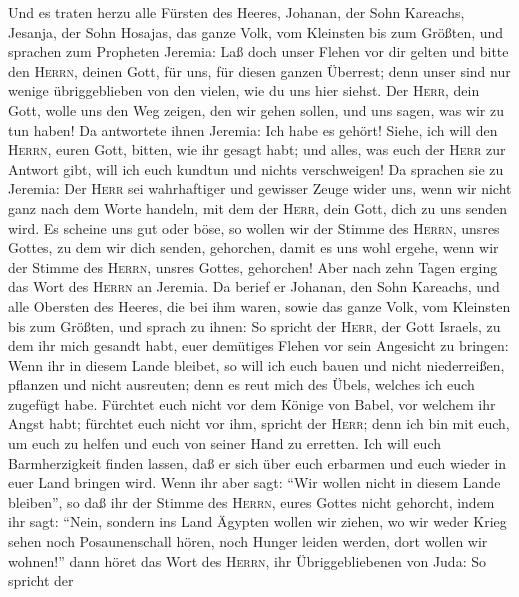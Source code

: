  Und es traten herzu alle Fürsten des Heeres, Johanan, der
Sohn Kareachs, Jesanja, der Sohn Hosajas, das ganze Volk, vom Kleinsten
bis zum Größten,  und sprachen zum Propheten Jeremia: Laß
doch unser Flehen vor dir gelten und bitte den \textsc{Herrn}, deinen
Gott, für uns, für diesen ganzen Überrest; denn unser sind nur wenige
übriggeblieben von den vielen, wie du uns hier siehst. 
Der \textsc{Herr}, dein Gott, wolle uns den Weg zeigen, den wir gehen
sollen, und uns sagen, was wir zu tun haben!  Da
antwortete ihnen Jeremia: Ich habe es gehört! Siehe, ich will den
\textsc{Herrn}, euren Gott, bitten, wie ihr gesagt habt; und alles, was
euch der \textsc{Herr} zur Antwort gibt, will ich euch kundtun und
nichts verschweigen!  Da sprachen sie zu Jeremia: Der
\textsc{Herr} sei wahrhaftiger und gewisser Zeuge wider uns, wenn wir
nicht ganz nach dem Worte handeln, mit dem der \textsc{Herr}, dein Gott,
dich zu uns senden wird.  Es scheine uns gut oder böse, so
wollen wir der Stimme des \textsc{Herrn}, unsres Gottes, zu dem wir dich
senden, gehorchen, damit es uns wohl ergehe, wenn wir der Stimme des
\textsc{Herrn}, unsres Gottes, gehorchen!  Aber nach zehn
Tagen erging das Wort des \textsc{Herrn} an Jeremia.  Da
berief er Johanan, den Sohn Kareachs, und alle Obersten des Heeres, die
bei ihm waren, sowie das ganze Volk, vom Kleinsten bis zum Größten,
 und sprach zu ihnen: So spricht der \textsc{Herr}, der
Gott Israels, zu dem ihr mich gesandt habt, euer demütiges Flehen vor
sein Angesicht zu bringen:  Wenn ihr in diesem Lande
bleibet, so will ich euch bauen und nicht niederreißen, pflanzen und
nicht ausreuten; denn es reut mich des Übels, welches ich euch zugefügt
habe.  Fürchtet euch nicht vor dem Könige von Babel, vor
welchem ihr Angst habt; fürchtet euch nicht vor ihm, spricht der
\textsc{Herr}; denn ich bin mit euch, um euch zu helfen und euch von
seiner Hand zu erretten.  Ich will euch Barmherzigkeit
finden lassen, daß er sich über euch erbarmen und euch wieder in euer
Land bringen wird.  Wenn ihr aber sagt: ``Wir wollen
nicht in diesem Lande bleiben'', so daß ihr der Stimme des
\textsc{Herrn}, eures Gottes nicht gehorcht,  indem ihr
sagt: ``Nein, sondern ins Land Ägypten wollen wir ziehen, wo wir weder
Krieg sehen noch Posaunenschall hören, noch Hunger leiden werden, dort
wollen wir wohnen!''  dann höret das Wort des
\textsc{Herrn}, ihr Übriggebliebenen von Juda: So spricht der
